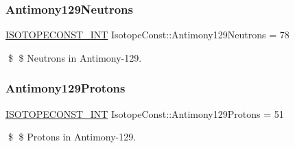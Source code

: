 \subsubsection{\texorpdfstring{Antimony129\+Neutrons}{Antimony129Neutrons}}
{\footnotesize\ttfamily \mbox{\hyperlink{group___isotope_const-_macros_ga5f18360b3e99483a35c32d789e62621c}{I\+S\+O\+T\+O\+P\+E\+C\+O\+N\+S\+T\+\_\+\+I\+NT}} Isotope\+Const\+::\+Antimony129\+Neutrons = 78}

\$ \$ Neutrons in Antimony-\/129. \mbox{\label{group___isotope_const-_antimony-_sb129_gaef447a05a4f0ec4c3f9d0b9bbea3c4ce}} 
\subsubsection{\texorpdfstring{Antimony129\+Protons}{Antimony129Protons}}
{\footnotesize\ttfamily \mbox{\hyperlink{group___isotope_const-_macros_ga5f18360b3e99483a35c32d789e62621c}{I\+S\+O\+T\+O\+P\+E\+C\+O\+N\+S\+T\+\_\+\+I\+NT}} Isotope\+Const\+::\+Antimony129\+Protons = 51}

\$ \$ Protons in Antimony-\/129. 